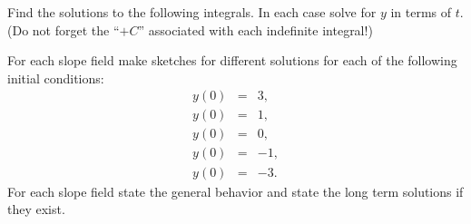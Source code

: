 \begin{problem}
\item Find the solutions to the following integrals. In each case
  solve for $y$ in terms of $t$. (Do not forget the ``$+C$''
  associated with each indefinite integral!)

\clearpage

\item For each slope field make sketches for different solutions for
  each of the following initial conditions:
  \begin{eqnarray*}
    y(0) & = & 3, \\
    y(0) & = & 1, \\
    y(0) & = & 0, \\
    y(0) & = & -1, \\
    y(0) & = & -3.
  \end{eqnarray*}
  For each slope field state the general behavior and state the long
  term solutions if they exist.


\end{problem}
